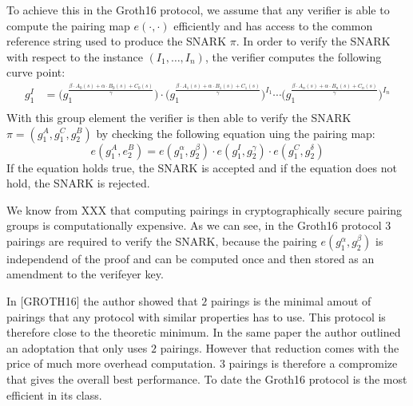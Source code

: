 To achieve this in the Groth16 protocol, we assume that any verifier is able to compute the pairing map $e(\cdot,\cdot)$ efficiently and has access to the common reference string used to produce the SNARK $\pi$. In order to verify the SNARK with respect to the instance $(I_1,\ldots, I_n)$, the verifier computes the following curve point:
\begin{align*}
g_1^I & = \Big(g_1^{\frac{\beta\cdot A_{0}(s)+\alpha\cdot B_{0}(s)+C_{0}(s)}{\gamma}}\Big)\cdot \Big(g_1^{\frac{\beta\cdot A_{1}(s)+\alpha\cdot B_{1}(s)+C_{1}(s)}{\gamma}}\Big)^{I_1} \cdots \Big(g_1^{\frac{\beta\cdot A_{n}(s)+\alpha\cdot B_{n}(s)+C_{n}(s)}{\gamma}}\Big)^{I_n}\\
\end{align*}
With this group element the verifier is then able to verify the SNARK $\pi=(g_1^A,g_1^C,g_2^B)$ by checking the following equation uing the pairing map:
\begin{equation}
e(g_1^A, e_2^B) = e(g_1^\alpha,g_2^\beta)\cdot e(g_1^I,g_2^\gamma)\cdot e(g_1^C,g_2^\delta)
\end{equation}
If the equation holds true, the SNARK is accepted and if the equation does not hold, the SNARK is rejected.
\begin{remark}
We know from XXX that computing pairings in cryptographically secure pairing groups is computationally expensive. As we can see, in the Groth16 protocol $3$ pairings are required to verify the SNARK, because the pairing $e(g_1^\alpha,g_2^\beta)$ is independend of the proof and can be computed once and then stored as an amendment to the verifeyer key. 

In [GROTH16] the author showed that $2$ pairings is the minimal amout of pairings that any protocol with similar properties has to use. This protocol is therefore close to the theoretic minimum. In the same paper the author outlined an adoptation that only uses $2$ pairings. However that reduction comes with the price of much more overhead computation. $3$ pairings is therefore a compromize that gives the overall best performance. To date the Groth16 protocol is the most efficient in its class. 
\end{remark}
